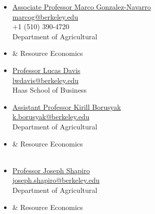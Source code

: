 \documentclass[10pt, oneside]{article}
\begin{document}
\begin{minipage}[t]{0.8\linewidth}
\begin{minipage}[t]{0.5\linewidth}
\begin{itemize}[noitemsep,nolistsep]
\item[] \underline{Associate Professor Marco Gonzalez-Navarro} \\
\href{mailto:marcog@berkeley.edu}{marcog@berkeley.edu} \\ 
+1 (510) 390-4720 \\
Department of Agricultural
\item[] \hspace{4mm} \& Resource Economics \\
\item[] \underline{Professor Lucas Davis} \\
\href{mailto:lwdavis@berkeley.edu}{lwdavis@berkeley.edu} \\
Haas School of Business 
\end{itemize}
\end{minipage}
\begin{minipage}[t]{0.4\linewidth}
\begin{itemize}[noitemsep,nolistsep]
    \item[] \underline{Assistant Professor Kirill Borusyak} \\
\href{k.borusyak@berkeley.edu}{k.borusyak@berkeley.edu} \\ 
Department of Agricultural
\item[] \hspace{4mm} \& Resource Economics\\\\ 
\item[] \underline{Professor Joseph Shapiro} \\
\href{mailto:joseph.shapiro@berkeley.edu}{joseph.shapiro@berkeley.edu} \\ 
Department of Agricultural
\item[] \hspace{4mm} \& Resource Economics
\end{itemize}
\end{minipage}
\end{minipage}\vspace{5mm}
\end{document}
